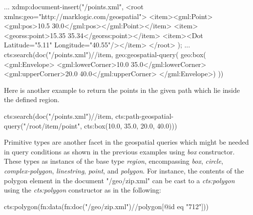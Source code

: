 \documentclass[a4paper,12pt]{article}
\begin{document}
\vspace{10px}
\begin{fakeJSON}[escapechar=\%]
...
xdmp:document-insert("/points.xml",
<root xmlns:geo="http://marklogic.com/geospatial">
  <item><gml:Point><gml:pos>10.5 30.0</gml:pos></gml:Point></item>
  <item><georss:point>15.35 35.34</georss:point></item>
  <item><Dot Latitude="5.11" Longitude="40.55"/></item>
</root> );
 ...
cts:search(doc("/points.xml")//item, 
 geo:geospatial-query(
   geo:box(
     <gml:Envelope>
       <gml:lowerCorner>10.0 35.0</gml:lowerCorner>
       <gml:upperCorner>20.0 40.0</gml:upperCorner>
     </gml:Envelope>)
 ))
 
 \end{fakeJSON}
\vspace{10px}
Here is another example to return the points in the given path which lie inside the defined region.
\vspace{10px}
\begin{fakeJSON}
cts:search(doc("/points.xml")//item,
  cts:path-geospatial-query("/root/item/point", 
  			cts:box(10.0, 35.0, 20.0, 40.0)))
\end{fakeJSON}
\vspace{10px}
Primitive types are another facet in the geospatial queries which might be needed in query conditions as shown in the previous examples using \textit{box} constructor. These types as instancs of the base type \textit{region}, encompassing \textit{box}, \textit{circle}, \textit{complex-polygon}, \textit{linestring}, \textit{point}, and \textit{polygon}. For instance, the contents of the polygon element in the document "/geo/zip.xml" can be cast to a \textit{cts:polygon} using the \textit{cts:polygon} constructor as in the following:
\vspace{10px}
\begin{fakeJSON}
cts:polygon(fn:data(fn:doc("/geo/zip.xml")//polygon[@id eq "712"]))
\end{fakeJSON}
\vspace{10px}
\end{document}
